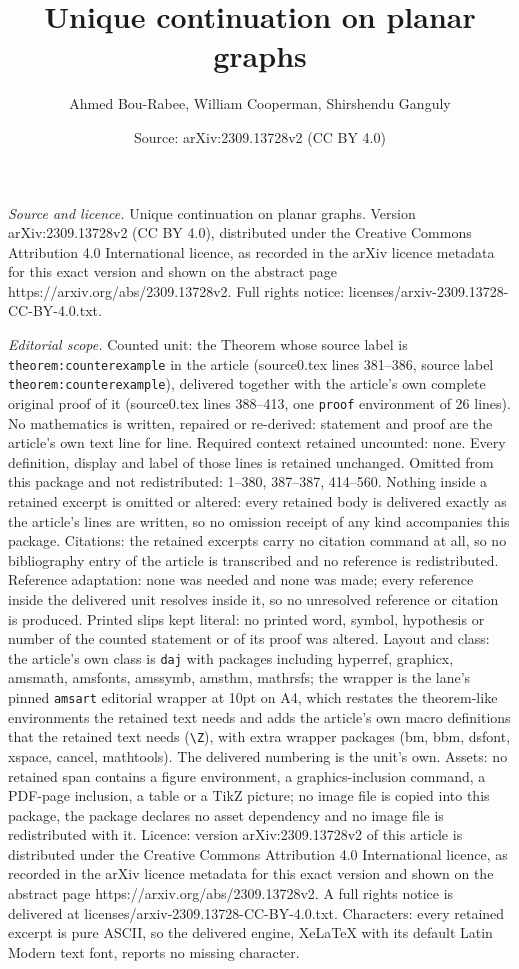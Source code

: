 \documentclass[10pt,a4paper]{amsart}
\title[Unique continuation on planar graphs]{Unique continuation on planar graphs}
\author{Ahmed Bou-Rabee, William Cooperman, Shirshendu Ganguly}
\date{Source: arXiv:2309.13728v2 (CC BY 4.0)}
\begin{document}
\maketitle

\noindent\emph{Source and licence.} Unique continuation on planar graphs. Version arXiv:2309.13728v2 (CC BY 4.0), distributed under the Creative Commons Attribution 4.0 International licence, as recorded in the arXiv licence metadata for this exact version and shown on the abstract page https://arxiv.org/abs/2309.13728v2. Full rights notice: licenses/arxiv-2309.13728-CC-BY-4.0.txt.\par\smallskip

\noindent\textit{Editorial scope.} Counted unit: the Theorem whose source label is \texttt{theorem:counterexample} in the article (source0.tex lines 381--386, source label \texttt{theorem:counterexample}), delivered together with the article's own complete original proof of it (source0.tex lines 388--413, one \texttt{proof} environment of 26 lines). No mathematics is written, repaired or re-derived: statement and proof are the article's own text line for line. Required context retained uncounted: none. Every definition, display and label of those lines is retained unchanged. Omitted from this package and not redistributed: 1--380, 387--387, 414--560. Nothing inside a retained excerpt is omitted or altered: every retained body is delivered exactly as the article's lines are written, so no omission receipt of any kind accompanies this package. Citations: the retained excerpts carry no citation command at all, so no bibliography entry of the article is transcribed and no reference is redistributed. Reference adaptation: none was needed and none was made; every reference inside the delivered unit resolves inside it, so no unresolved reference or citation is produced. Printed slips kept literal: no printed word, symbol, hypothesis or number of the counted statement or of its proof was altered. Layout and class: the article's own class is \texttt{daj} with packages including hyperref, graphicx, amsmath, amsfonts, amssymb, amsthm, mathrsfs; the wrapper is the lane's pinned \texttt{amsart} editorial wrapper at 10pt on A4, which restates the theorem-like environments the retained text needs and adds the article's own macro definitions that the retained text needs (\texttt{\textbackslash Z}), with extra wrapper packages (bm, bbm, dsfont, xspace, cancel, mathtools). The delivered numbering is the unit's own. Assets: no retained span contains a figure environment, a graphics-inclusion command, a PDF-page inclusion, a table or a TikZ picture; no image file is copied into this package, the package declares no asset dependency and no image file is redistributed with it. Licence: version arXiv:2309.13728v2 of this article is distributed under the Creative Commons Attribution 4.0 International licence, as recorded in the arXiv licence metadata for this exact version and shown on the abstract page https://arxiv.org/abs/2309.13728v2. A full rights notice is delivered at licenses/arxiv-2309.13728-CC-BY-4.0.txt. Characters: every retained excerpt is pure ASCII, so the delivered engine, XeLaTeX with its default Latin Modern text font, reports no missing character.
\end{document}
